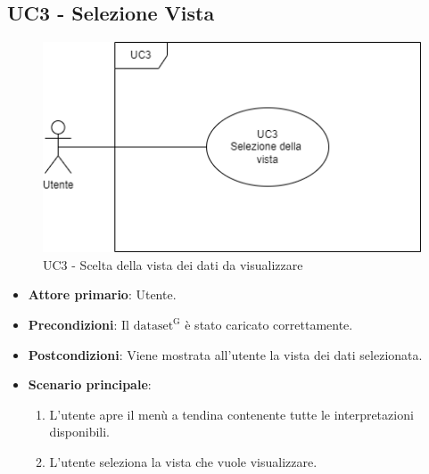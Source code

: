

\subsection{UC3 - Selezione Vista}
\label{sec:UC3}
\begin{figure}[h!]
    \centering
    \includegraphics[scale=0.60]{../../assets/scelta_vista.png}
    \caption{UC3 - Scelta della vista dei dati da visualizzare}
\end{figure}
\begin{itemize}
    \item \textbf{Attore primario}: Utente.
    \item \textbf{Precondizioni}: Il ${\mathrm{dataset^{G}}}$ è stato caricato correttamente.
    \item \textbf{Postcondizioni}: Viene mostrata all'utente la vista dei dati selezionata.
    \item \textbf{Scenario principale}:
          \begin{enumerate}
              \item L'utente apre il menù a tendina contenente tutte le interpretazioni disponibili.
              \item L'utente seleziona la vista che vuole visualizzare.
          \end{enumerate}
\end{itemize}
\newpage


